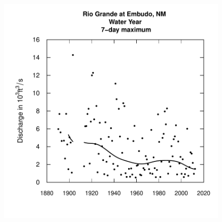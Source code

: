 \documentclass[a4paper,11pt]{article}
\begin{document}
\begin{figure}[htbp]
  \begin{minipage}[h]{0.5\linewidth}
    \begin{center}

\includegraphics{EGRET-figplotFlowSingle}
    \label{fig:plotFlowSingle}
    \end{center}
  \end{minipage}
  \hspace{0.5cm}
  \begin{minipage}[h]{0.5\linewidth}
    \begin{center}



\end{center}
\end{minipage}
\end{figure}
\end{document}
